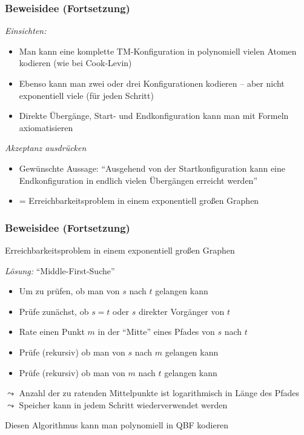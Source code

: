 \documentclass[aspectratio=1610,onlymath]{beamer}
\begin{document}
\begin{frame}\frametitle{Beweisidee (Fortsetzung)}

\emph{Einsichten:}
\begin{itemize}
\item Man kann eine komplette TM-Konfiguration in polynomiell vielen Atomen
  kodieren (wie bei Cook-Levin)
\item Ebenso kann man zwei oder drei Konfigurationen kodieren -- aber nicht exponentiell viele (für jeden Schritt)
\item Direkte Übergänge, Start- und Endkonfiguration kann man mit Formeln axiomatisieren
\end{itemize}\bigskip\pause

\emph{Akzeptanz ausdrücken}
\begin{itemize}
\item Gewünschte Aussage: "`Ausgehend von der Startkonfiguration kann eine Endkonfiguration in endlich vielen Übergängen erreicht werden"'
\item = Erreichbarkeitsproblem in einem exponentiell großen Graphen
\end{itemize}


\end{frame}

\begin{frame}\frametitle{Beweisidee (Fortsetzung)}

\alert{Erreichbarkeitsproblem in einem exponentiell großen Graphen}
\bigskip\pause

\emph{Lösung:} "`Middle-First-Suche"'
\begin{itemize}
\item Um zu prüfen, ob man von $s$ nach $t$ gelangen kann
\item Prüfe zunächst, ob $s=t$ oder $s$ direkter Vorgänger von $t$
\item Rate einen Punkt $m$ in der "`Mitte"' eines Pfades von $s$ nach $t$
\item Prüfe (rekursiv) ob man von $s$ nach $m$ gelangen kann
\item Prüfe (rekursiv) ob man von $m$ nach $t$ gelangen kann
\end{itemize}\pause
$\leadsto$ Anzahl der zu ratenden Mittelpunkte ist logarithmisch in Länge des Pfades\\
$\leadsto$ Speicher kann in jedem Schritt wiederverwendet werden
\bigskip

Diesen Algorithmus kann man polynomiell in QBF kodieren

\end{frame}
\end{document}
